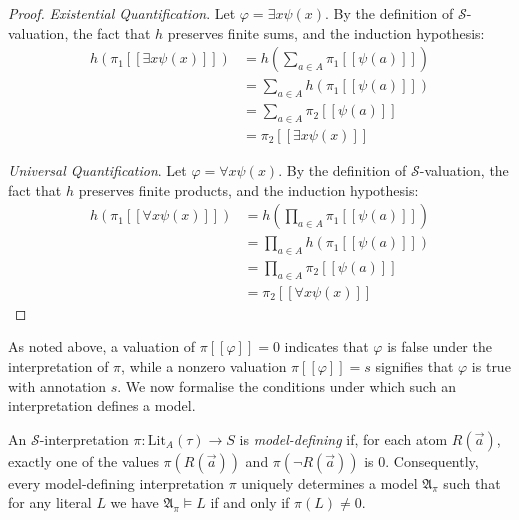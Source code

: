 \documentclass[oneside, 11pt]{amsbook}
\theoremstyle{plain}
\theoremstyle{definition}
\theoremstyle{remark}
\begin{document}
\begin{proof}
    \emph{Existential Quantification}. Let $\varphi = \exists x \psi(x)$. By the definition of $\mathcal{S}$-valuation, the fact that $h$ preserves finite sums, and the induction hypothesis:
    \[
        \begin{aligned}
            h(\pi_1 [\![ \exists x \psi(x) ]\!]) & = h\left(\sum_{a \in A} \pi_1 [\![ \psi(a) ]\!]\right) \\
                                                 & = \sum_{a \in A} h(\pi_1 [\![ \psi(a) ]\!])            \\
                                                 & = \sum_{a \in A} \pi_2 [\![ \psi(a) ]\!]               \\
                                                 & = \pi_2 [\![ \exists x \psi(x) ]\!]
        \end{aligned}
    \]

    \emph{Universal Quantification}. Let $\varphi = \forall x \psi(x)$. By the definition of $\mathcal{S}$-valuation, the fact that $h$ preserves finite products, and the induction hypothesis:
    \[
        \begin{aligned}
            h(\pi_1 [\![ \forall x \psi(x) ]\!]) & = h\left(\prod_{a \in A} \pi_1 [\![ \psi(a) ]\!]\right) \\
                                                 & = \prod_{a \in A} h(\pi_1 [\![ \psi(a) ]\!])            \\
                                                 & = \prod_{a \in A} \pi_2 [\![ \psi(a) ]\!]               \\
                                                 & = \pi_2 [\![ \forall x \psi(x) ]\!]
        \end{aligned}
    \]
\end{proof}

As noted above, a valuation of $\pi [\![ \varphi ]\!] = 0$ indicates that $\varphi$ is false under the interpretation of $\pi$, while a nonzero valuation $\pi [\![ \varphi ]\!] = s$ signifies that $\varphi$ is true with annotation $s$. We now formalise the conditions under which such an interpretation defines a model.

\begin{defn}
    An $\mathcal{S}$-interpretation $\pi : \mathrm{Lit}_{A}(\tau) \to S$ is \emph{model-defining} if, for each atom $R(\vec{a})$, exactly one of the values $\pi (R(\vec{a}))$ and $\pi (\lnot R(\vec{a}))$ is 0. Consequently, every model-defining interpretation $\pi$ uniquely determines a model $\mathfrak{A}_\pi$ such that for any literal $L$ we have $\mathfrak{A}_\pi \vDash L$ if and only if $\pi(L) \neq 0$.
\end{defn}
\end{document}
